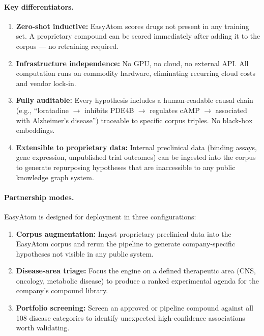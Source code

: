 \documentclass[11pt]{article}
\begin{document}
\paragraph{Key differentiators.}
\begin{enumerate}[noitemsep]
  \item \textbf{Zero-shot inductive:} EasyAtom scores drugs not present
    in any training set. A proprietary compound can be scored immediately
    after adding it to the corpus --- no retraining required.
  \item \textbf{Infrastructure independence:} No GPU, no cloud, no external
    API. All computation runs on commodity hardware, eliminating recurring
    cloud costs and vendor lock-in.
  \item \textbf{Fully auditable:} Every hypothesis includes a human-readable
    causal chain (e.g., ``loratadine $\to$ inhibits PDE4B $\to$ regulates
    cAMP $\to$ associated with Alzheimer's disease'') traceable to specific
    corpus triples. No black-box embeddings.
  \item \textbf{Extensible to proprietary data:} Internal preclinical data
    (binding assays, gene expression, unpublished trial outcomes) can be
    ingested into the corpus to generate repurposing hypotheses that are
    inaccessible to any public knowledge graph system.
\end{enumerate}

\paragraph{Partnership modes.}
EasyAtom is designed for deployment in three configurations:
\begin{enumerate}[noitemsep]
  \item \textbf{Corpus augmentation:} Ingest proprietary preclinical data
    into the EasyAtom corpus and rerun the pipeline to generate
    company-specific hypotheses not visible in any public system.
  \item \textbf{Disease-area triage:} Focus the engine on a defined
    therapeutic area (CNS, oncology, metabolic disease) to produce a
    ranked experimental agenda for the company's compound library.
  \item \textbf{Portfolio screening:} Screen an approved or pipeline
    compound against all 108 disease categories to identify unexpected
    high-confidence associations worth validating.
\end{enumerate}

\end{document}
